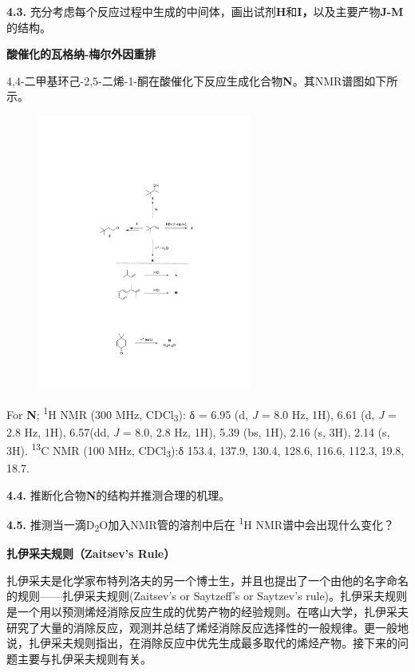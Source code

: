 \noindent\textbf{4.3.}
充分考虑每个反应过程中生成的中间体，画出试剂\textbf{H}和\textbf{I，}以及主要产物\textbf{J-M}的结构。

\noindent\textbf{酸催化的瓦格纳-梅尔外因重排}

4,4-二甲基环己-2,5-二烯-1-酮在酸催化下反应生成化合物\textbf{N}。其NMR谱图如下所示。

\begin{figure}[h!]
	\centering
	\includegraphics[width=7cm]{./pic/t4-5.pdf}
\end{figure}

For \textbf{N}; \textsuperscript{1}H NMR (300 MHz, CDCl\textsubscript{3}): δ = 6.95 (d,
\emph{J} = 8.0 Hz, 1H), 6.61 (d, \emph{J} = 2.8 Hz, 1H), 6.57(dd, \emph{J} = 8.0, 2.8 Hz, 1H), 5.39 (bs, 1H), 2.16 (s, 3H), 2.14 (s,
3H). \textsuperscript{13}C NMR (100 MHz, CDCl\textsubscript{3}):δ 153.4, 137.9, 130.4, 128.6, 116.6, 112.3, 19.8, 18.7.

\noindent\textbf{4.4.} 推断化合物\textbf{N}的结构并推测合理的机理。

\noindent\textbf{4.5.} 推测当一滴D\textsubscript{2}O加入NMR管的溶剂中后在
\textsuperscript{1}H NMR谱中会出现什么变化？

\noindent\textbf{扎伊采夫规则（Zaitsev's Rule）}

扎伊采夫是化学家布特列洛夫的另一个博士生，并且也提出了一个由他的名字命名的规则------扎伊采夫规则(Zaitsev's or Saytzeff's or Saytzev's rule)。扎伊采夫规则是一个用以预测烯烃消除反应生成的优势产物的经验规则。在喀山大学，扎伊采夫研究了大量的消除反应，观测并总结了烯烃消除反应选择性的一般规律。更一般地说，扎伊采夫规则指出，在消除反应中优先生成最多取代的烯烃产物。接下来的问题主要与扎伊采夫规则有关。

